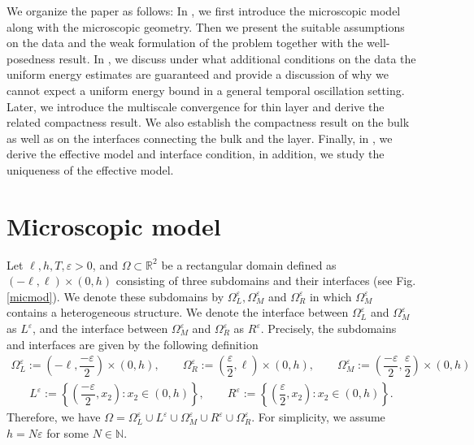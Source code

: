 \documentclass[11pt]{article}
\def\es{\varepsilon}
\def\orr{\Omega_R^\varepsilon}
\def\omm{\Omega_M^\varepsilon}
\def\oll{\Omega_L^\varepsilon}
\begin{document}
 

We organize the paper as follows: In , we first introduce the microscopic model along with the microscopic geometry. Then we present the suitable assumptions on the data and the weak formulation of the problem together with the well-posedness result. In , we discuss under what additional conditions on the data the uniform energy estimates are guaranteed and provide a discussion of why we cannot expect a uniform energy bound in a general temporal oscillation setting. Later, we introduce the multiscale convergence for thin layer and derive the related compactness result. We also establish the compactness result on the bulk as well as on the interfaces connecting the bulk and the layer. Finally, in , we derive the effective model and interface condition, in addition, we study the uniqueness of the effective model.




\section{Microscopic model}\label{sect:microscopic_model}

Let $\ell,h, T, \es>0$, and $\Omega\subset\mathbb{R}^2$ be a rectangular domain defined as $(-\ell,\ell)\times (0,h)$ consisting of three subdomains and their interfaces (see Fig. \ref{micmod}). We denote these subdomains by $\Omega_L^\es, \Omega_M^\es$ and $\Omega_R^\es$ in which $\Omega_M^\es$ contains a heterogeneous structure. We denote the interface between $\Omega_L^\es$ and $\Omega_M^\es$ as $L^\es$, and  the interface between $\Omega_M^\es$ and $\Omega_R^\es$ as $R^\es$.
Precisely, the subdomains and interfaces are given by the following definition
\begin{align*}
    \oll := \left(-\ell,\dfrac{-\es}{2}\right)\times (0,h),\qquad
    \orr := \left(\dfrac{\es}{2},\ell\right)\times (0,h),\qquad
    \omm :=\left(\dfrac{-\es}{2},\dfrac{\es}{2}\right)\times (0,h)
    \end{align*}
    \begin{align*}
    L^\es:= \left\{\left(\dfrac{-\es}{2},x_2\right): x_2\in (0,h)\right\},\qquad
    R^\es:= \left\{\left(\dfrac{\es}{2},x_2\right): x_2\in (0,h)\right\}.
\end{align*}
Therefore, we have $\Omega=\oll\cup L^\es\cup\omm\cup R^\es\cup\orr$.  For simplicity, we assume $h=N\es$ for some $N\in \mathbb{N}$.
\end{document}
